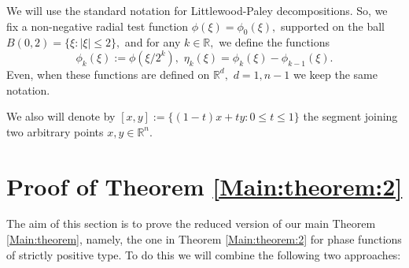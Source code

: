 \documentclass[12pt, reqno]{amsart}
\theoremstyle{definition}
\theoremstyle{remark}
\numberwithin{equation}{section}
\begin{document}
We will use the standard notation for Littlewood-Paley decompositions. So, we fix a  non-negative radial test function $\phi(\xi)=\phi_0(\xi),$ supported on the ball $B(0,2)=\{\xi:|\xi|\leq 2\},$ and for any $k\in \mathbb{R},$ we define the functions
\begin{equation}\label{Littlewood:Paley:components}
    \phi_{k}(\xi):=\phi(\xi/2^k),\,\,\eta_{k}(\xi)=\phi_{k}(\xi)-\phi_{k-1}(\xi).
\end{equation}Even, when these functions are defined on $\mathbb{R}^{d},$ $d=1,n-1$ we keep the same notation. 

We also will denote by $[x,y]:=\{(1-t)x+ty:0\leq t\leq 1\}$ the segment joining two arbitrary points $x,y\in \mathbb{R}^n.$

\section{Proof of Theorem  \ref{Main:theorem:2}}\label{Section:Main:theorem:2}
The aim of this section is to prove the reduced version of our main Theorem \ref{Main:theorem}, namely, the one in Theorem \ref{Main:theorem:2} for phase functions of strictly positive type. To do this we will combine the following two approaches:
\end{document}
